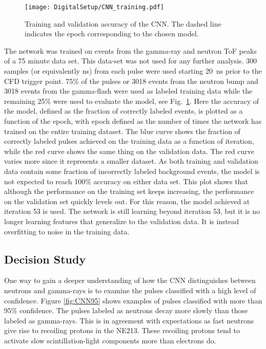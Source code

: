 \documentclass[main.tex]{subfiles}
\begin{document}
\begin{figure}[ht!]
    \centering
        \texttt{[image: DigitalSetup/CNN\_training.pdf]}
        \caption[Training and validation accuracy of the CNN.]{Training and validation accuracy of the CNN. The dashed line indicates the epoch corresponding to the chosen model.}
    \label{fig:CNN_training} 
\end{figure}

The network was trained on events from the gamma-ray and neutron ToF peaks of a 75 minute data set. This data-set was not used for any further analysis. 300 samples (or equivalently ns) from each pulse were used starting \SI{20}{ns} prior to the CFD trigger point. 75\% of the pulses or 3018 events from the neutron bump and 3018 events from the gamma-flash were used as labeled training data while the remaining 25\% were used to evaluate the model, see Fig.~\ref{fig:CNN_training}. Here the accuracy of the model, defined as the fraction of correctly labeled events, is plotted as a function of the epoch, with epoch defined as the number of times the network has trained on the entire training dataset. The blue curve shows the fraction of correctly labeled pulses achieved on the training data as a function of iteration, while the red curve shows the same thing on the validation data. The red curve varies more since it represents a smaller dataset. As both training and validation data contain some fraction of incorrectly labeled background events, the model is not expected to reach 100\% accuracy on either data set. This plot shows that although the performance on the training set keeps increasing, the performance on the validation set quickly levels out. For this reason, the model achieved at iteration 53 is used. The network is still learning beyond iteration 53, but it is no longer learning features that generalize to the validation data. It is instead overfitting to noise in the training data.


\subsection{Decision Study}
One way to gain a deeper understanding of how the CNN distinguishes between neutrons and gamma-rays is to examine the pulses classified with a high level of confidence. Figure \ref{fig:CNN95} shows examples of pulses classified with more than 95\% confidence. The pulses labeled as neutrons decay more slowly than those labeled as gamma-rays. This is in agreement with expectations as fast neutrons give rise to recoiling protons in the NE213. These recoiling protons tend to activate slow scintillation-light components more than electrons do. 
\end{document}
